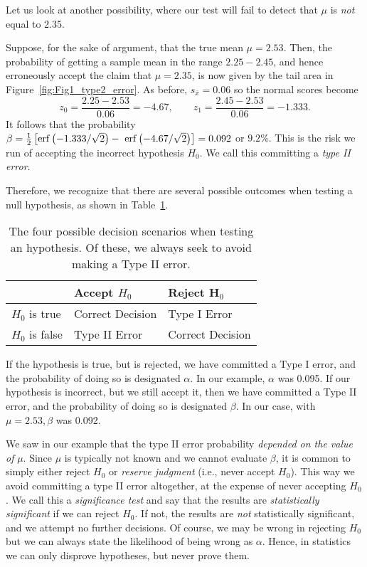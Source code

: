 
	Let us look at another possibility, where our test will fail to detect that $\mu$ is \emph{not} equal to 2.35.
\begin{example}
Suppose, for the sake of argument, that the true mean $\mu = 2.53$.  Then, the probability of getting a 
sample mean in the range $2.25 - 2.45$, and hence erroneously accept the claim that $\mu = 2.35$, is 
now given by the tail area in Figure~\ref{fig:Fig1_type2_error}.
 As before, $s_{\bar{x}} = 0.06$ so the normal scores become
\begin{equation}
z_0 = \frac{2.25 - 2.53}{0.06} = -4.67, \quad \quad z_1 = \frac{2.45-2.53}{0.06} = -1.333.
\end{equation}	           
It follows that the probability $\beta = \frac{1}{2} \left[ \operatorname{erf}\left( -1.333 / \sqrt{2} \right)- \ \operatorname{erf} \left( -4.67/ \sqrt{2} \right) \right ]   = 0.092$ or $9.2\%$.
This is the risk we run of accepting the incorrect hypothesis $H_0$.  We call this committing a \emph{type II error}.
\end{example}

Therefore, we recognize that there are several possible outcomes when testing a null hypothesis, as
shown in Table~\ref{tbl:typerror}.
\begin{table}[h]
\centering
\begin{tabular}{|l|l|l|} \hline
&  \bf{Accept} $H_0$  & \bf{Reject} H$_{0}$ \\ \hline
$H_0$ is true & Correct Decision & Type I Error \\ \hline
$H_0$ is false & Type II Error & Correct Decision \\ \hline
\end{tabular}
\caption{The four possible decision scenarios when testing an hypothesis.  Of these, we always
seek to avoid making a Type II error.}
\label{tbl:typerror}
\end{table}
If the hypothesis is true, but is rejected, we have committed a Type I error, and the probability of 
doing so is designated $\alpha$.  In our example, $\alpha$ was 0.095.  If our hypothesis is incorrect, but we 
still accept it, then we have committed a Type II error, and the probability of doing so is 
designated $\beta$.  In our case, with $\mu = 2.53, \beta$  was 0.092.

	We saw in our example that the type II error probability \emph{depended on the value of} $\mu$.  Since $\mu$ 
is typically not known and we cannot evaluate $\beta$, it is common to simply either reject $H_0$ or \emph{reserve judgment} (i.e., never 
accept $H_0$).  This way we avoid committing a type II error altogether, at the expense of never 
accepting $H_0$.  We call this a \emph{significance test} and say that the results are \emph{statistically significant} 
if we can reject $H_0$.  If not, the results are \emph{not} statistically significant, and we attempt no further 
decisions.  Of course, we may be wrong in rejecting $H_0$ but we can always state the likelihood of being wrong as $\alpha$.
Hence, in statistics we can only disprove hypotheses, but never prove them.

